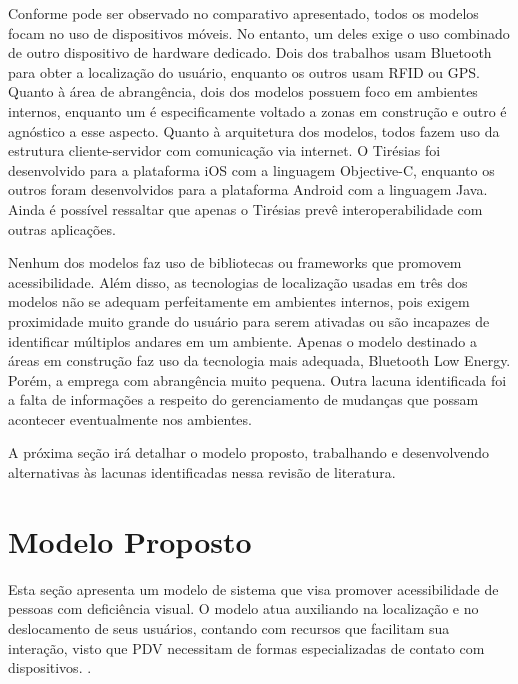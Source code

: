 \documentclass[twoside,english,brazilian]{UNISINOSartigo}
\begin{document}
Conforme pode ser observado no comparativo apresentado, todos os modelos focam no uso de dispositivos móveis. No entanto, um deles exige o uso combinado de outro dispositivo de hardware dedicado. Dois dos trabalhos usam Bluetooth para obter a localização do usuário, enquanto os outros usam RFID ou GPS. Quanto à área de abrangência, dois dos modelos possuem foco em ambientes internos, enquanto um é especificamente voltado a zonas em construção e outro é agnóstico a esse aspecto.
Quanto à arquitetura dos modelos, todos fazem uso da estrutura cliente-servidor com comunicação via internet. O Tirésias foi desenvolvido para a plataforma iOS com a linguagem Objective-C, enquanto os outros foram desenvolvidos para a plataforma Android com a linguagem Java. Ainda é possível ressaltar que apenas o Tirésias prevê interoperabilidade com outras aplicações.

Nenhum dos modelos faz uso de bibliotecas ou frameworks que promovem acessibilidade. Além disso, as tecnologias de localização usadas em três dos modelos não se adequam perfeitamente em ambientes internos, pois exigem proximidade muito grande do usuário para serem ativadas ou são incapazes de identificar múltiplos andares em um ambiente. Apenas o modelo destinado a áreas em construção faz uso da tecnologia mais adequada, Bluetooth Low Energy. Porém, a emprega com abrangência muito pequena. Outra lacuna identificada foi a falta de informações a respeito do gerenciamento de mudanças que possam acontecer eventualmente nos ambientes.

A próxima seção irá detalhar o modelo proposto, trabalhando e desenvolvendo alternativas às lacunas identificadas nessa revisão de literatura.

\section{Modelo Proposto}
Esta seção apresenta um modelo de sistema que visa promover acessibilidade de pessoas com deficiência visual. O modelo atua auxiliando na localização e no deslocamento de seus usuários, contando com recursos que facilitam sua interação, visto que PDV necessitam de formas especializadas de contato com dispositivos. .
\end{document}
